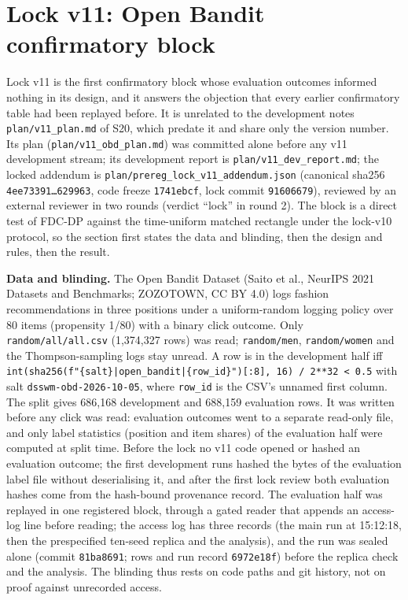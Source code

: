 \documentclass[sigconf,anonymous,review]{acmart}
\begin{document}
\clearpage
\section{Lock v11: Open Bandit confirmatory block}\label{app:v11}

Lock v11 is the first confirmatory block whose evaluation outcomes informed nothing in its design, and it answers the objection that every earlier confirmatory table had been replayed before. It is unrelated to the development notes \texttt{plan/v11\_plan.md} of S20, which predate it and share only the version number. Its plan (\texttt{plan/v11\_obd\_plan.md}) was committed alone before any v11 development stream; its development report is \texttt{plan/v11\_dev\_report.md}; the locked addendum is \texttt{plan/prereg\_lock\_v11\_addendum.json} (canonical sha256 \texttt{4ee73391\ldots 629963}, code freeze \texttt{1741ebcf}, lock commit \texttt{91606679}), reviewed by an external reviewer in two rounds (verdict ``lock'' in round 2). The block is a direct test of FDC-DP against the time-uniform matched rectangle under the lock-v10 protocol, so the section first states the data and blinding, then the design and rules, then the result.




\textbf{Data and blinding.} The Open Bandit Dataset (Saito et al., NeurIPS 2021 Datasets and Benchmarks; ZOZOTOWN, CC BY 4.0) logs fashion recommendations in three positions under a uniform-random logging policy over 80 items (propensity 1/80) with a binary click outcome. Only \texttt{random/all/all.csv} (1,374,327 rows) was read; \texttt{random/men}, \texttt{random/women} and the Thompson-sampling logs stay unread. A row is in the development half iff \texttt{int(sha256(f"\{salt\}|open\_bandit|\{row\_id\}")[:8], 16) / 2**32 < 0.5} with salt \texttt{dsswm-obd-2026-10-05}, where \texttt{row\_id} is the CSV's unnamed first column. The split gives 686,168 development and 688,159 evaluation rows. It was written before any click was read: evaluation outcomes went to a separate read-only file, and only label statistics (position and item shares) of the evaluation half were computed at split time. Before the lock no v11 code opened or hashed an evaluation outcome; the first development runs hashed the bytes of the evaluation label file without deserialising it, and after the first lock review both evaluation hashes come from the hash-bound provenance record. The evaluation half was replayed in one registered block, through a gated reader that appends an access-log line before reading; the access log has three records (the main run at 15:12:18, then the prespecified ten-seed replica and the analysis), and the run was sealed alone (commit \texttt{81ba8691}; rows and run record \texttt{6972e18f}) before the replica check and the analysis. The blinding thus rests on code paths and git history, not on proof against unrecorded access.
\end{document}
